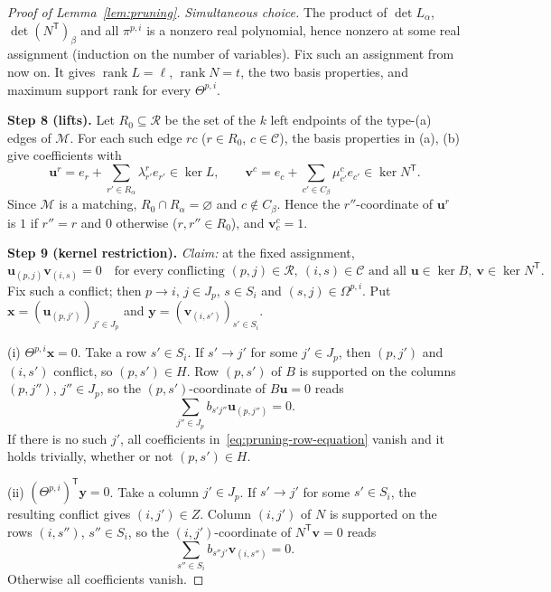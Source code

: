 \documentclass[11pt]{article}
\theoremstyle{remark}
\DeclareMathOperator{\rank}{rank}
\newcommand{\step}[1]{\par\smallskip\noindent\textbf{Step #1.}}
\newcommand{\cR}{\mathcal R}
\newcommand{\cC}{\mathcal C}
\newcommand{\cM}{\mathcal M}
\newcommand{\bu}{\mathbf u}
\newcommand{\bv}{\mathbf v}
\newcommand{\tr}{\mathsf T}
\begin{document}
\begin{proof}[Proof of Lemma~\ref{lem:pruning}]
\emph{Simultaneous choice.} The product of $\det L_\alpha$,
$\det(N^{\tr})_\beta$ and all $\pi^{p,i}$ is a nonzero real polynomial, hence
nonzero at some real assignment (induction on the number of variables). Fix
such an assignment from now on. It gives $\rank L=\ell$, $\rank N=t$, the two
basis properties, and maximum support rank for every $\Theta^{p,i}$.

\step{8 (lifts)} Let $R_0\subseteq\cR$ be the set of the $k$ left endpoints of
the type-(a) edges of $\cM$. For each such edge $rc$ ($r\in R_0$, $c\in\cC$),
the basis properties in (a), (b) give coefficients with
\begin{equation}\label{eq:pruning-lifts}
 \bu^r=e_r+\sum_{r'\in R_\alpha}\lambda_{r'}^re_{r'}\in\ker L,\qquad
 \bv^c=e_c+\sum_{c'\in C_\beta}\mu_{c'}^ce_{c'}\in\ker N^{\tr}.
\end{equation}
Since $\cM$ is a matching, $R_0\cap R_\alpha=\varnothing$ and $c\notin C_\beta$.
Hence the $r''$-coordinate of $\bu^r$ is $1$ if $r''=r$ and $0$ otherwise
($r,r''\in R_0$), and $\bv^c_c=1$.

\step{9 (kernel restriction)} \emph{Claim:} at the fixed assignment,
\begin{equation}\label{eq:conflict-kernel}
 \bu_{(p,j)}\bv_{(i,s)}=0
 \quad\text{for every conflicting }(p,j)\in\cR,\ (i,s)\in\cC
 \text{ and all }\bu\in\ker B,\ \bv\in\ker N^{\tr}.
\end{equation}
Fix such a conflict; then $p\to i$, $j\in J_p$, $s\in S_i$ and
$(s,j)\in\Omega^{p,i}$. Put $\mathbf x=(\bu_{(p,j')})_{j'\in J_p}$ and
$\mathbf y=(\bv_{(i,s')})_{s'\in S_i}$.

(i) $\Theta^{p,i}\mathbf x=0$. Take a row $s'\in S_i$. If $s'\to j'$ for some
$j'\in J_p$, then $(p,j')$ and $(i,s')$ conflict, so $(p,s')\in H$. Row
$(p,s')$ of $B$ is supported on the columns $(p,j'')$, $j''\in J_p$, so the
$(p,s')$-coordinate of $B\bu=0$ reads
\begin{equation}\label{eq:pruning-row-equation}
 \sum_{j''\in J_p}b_{s'j''}\bu_{(p,j'')}=0.
\end{equation}
If there is no such $j'$, all coefficients in~\eqref{eq:pruning-row-equation}
vanish and it holds trivially, whether or not $(p,s')\in H$.

(ii) $(\Theta^{p,i})^{\tr}\mathbf y=0$. Take a column $j'\in J_p$. If
$s'\to j'$ for some $s'\in S_i$, the resulting conflict gives $(i,j')\in Z$.
Column $(i,j')$ of $N$ is supported on the rows $(i,s'')$, $s''\in S_i$, so the
$(i,j')$-coordinate of $N^{\tr}\bv=0$ reads
\begin{equation}\label{eq:pruning-column-equation}
 \sum_{s''\in S_i}b_{s''j'}\bv_{(i,s'')}=0.
\end{equation}
Otherwise all coefficients vanish.


\end{proof}
\end{document}
